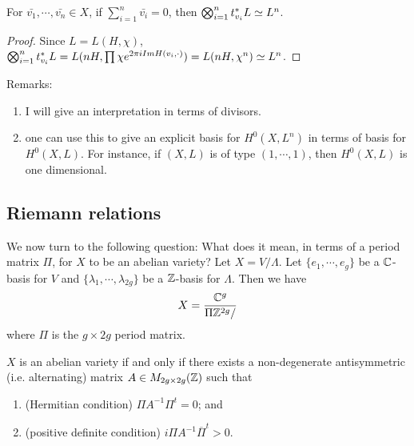 \begin{lemma}
For $\bar{v_1},\cdots,\bar{v_n}\in X$, if $\sum_{i=1}^n \bar{v_i}=0$, then $\bigotimes_{i=1}^n t^*_{v_i} L\simeq L^n$.
\end{lemma}
\begin{proof}
Since $L=L(H,\chi)$, $\bigotimes_{i=1}^n t^*_{v_i} L
=L(nH,\prod \chi e^{2\pi i Im H(v_i,\cdot)})=L(nH,\chi^n)
\simeq L^n$.
\end{proof}

Remarks:
\begin{enumerate}
\item I will give an interpretation in terms of divisors.
\item one can use this to give an explicit basis for $H^0(X,L^n)$ in terms of basis for $H^0(X,L)$. For instance, if $(X,L)$ is of type $(1,\cdots,1)$, then $H^0(X,L)$ is one dimensional.
\end{enumerate}

\subsection{Riemann relations}

We now turn to the following question: What does it mean, in terms of a period matrix $\Pi$, for $X$ to be an abelian variety?
Let $X=V/\Lambda$. Let $\{e_1,\cdots , e_g\}$ be a ${\mathbb C}$-basis for $V$ and $\{\lambda_1,\cdots, \lambda_{2g}\}$ be a ${\mathbb Z}$-basis for $\Lambda$. Then we have 
$$X=\frac{{\mathbb C}^g}{\Pi {\mathbb Z}^{2g}/}$$
where $\Pi$ is the $g\times 2g$ period matrix. 

\begin{theorem}
$X$ is an abelian variety if and only if there exists a non-degenerate antisymmetric (i.e. alternating) matrix $A\in M_{2g\times 2g}({\mathbb Z})$ such that 
\begin{enumerate}
\item (Hermitian condition) $\Pi A^{-1} \Pi^t=0$; and
\item (positive definite condition) $i\Pi A^{-1}\overline{\Pi}^t>0$.
\end{enumerate}
\end{theorem}

